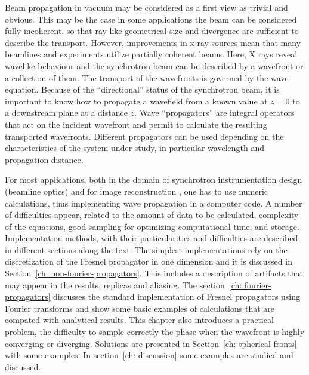 \documentclass{iucr}              %
\begin{document}
Beam propagation in vacuum may be considered as a first view as trivial and obvious. This may be the case in some applications the beam can be considered fully incoherent, so that ray-like geometrical size and divergence are sufficient to describe the transport. 
However, improvements in x-ray sources mean that many beamlines and experiments utilize partially coherent beams. Here, X rays reveal wavelike behaviour and the synchrotron beam can be described by a wavefront or a collection of them. The transport of the wavefronts is governed by the wave equation. Because of the ``directional'' status of the synchrotron beam, it is important to know how to propagate a wavefield from a known value at $z=0$ to a downstream plane at a distance $z$.   Wave ``propagators'' are integral operators that act on the incident wavefront and permit to calculate the resulting transported wavefronts. Different propagators can be used depending on the characteristics of the system under study, in particular wavelength and propagation distance. 

For most applications, both in the domain of synchrotron instrumentation design (beamline optics) and for image reconstruction \cite{maiden_josaa_2012,gilles_optica_2018}, one has to use numeric calculations, thus implementing wave propagation in a computer code. A number of difficulties appear, related to the amount of data to be calculated, complexity of the equations, good sampling for optimizing computational time, and storage. Implementation methods, with their particularities and difficulties are described in different sections along the text. The simplest implementations rely on the discretization of the Fresnel propagator in one dimension and it is discussed in Section~\ref{ch: non-fourier-propagators}. This includes a description of artifacts that may appear in the results, replicas and aliasing. The section~\ref{ch: fourier-propagators} discusses the standard implementation of Fresnel propagators using Fourier transforms and show some basic examples of calculations that are compated with analytical results. This chapter also introduces a practical problem, the difficulty to sample correctly the phase when the wavefront is highly converging or diverging. Solutions are presented in Section~\ref{ch: spherical fronts} with some examples. In section~\ref{ch: discussion} some examples are studied and discussed.
\end{document}
